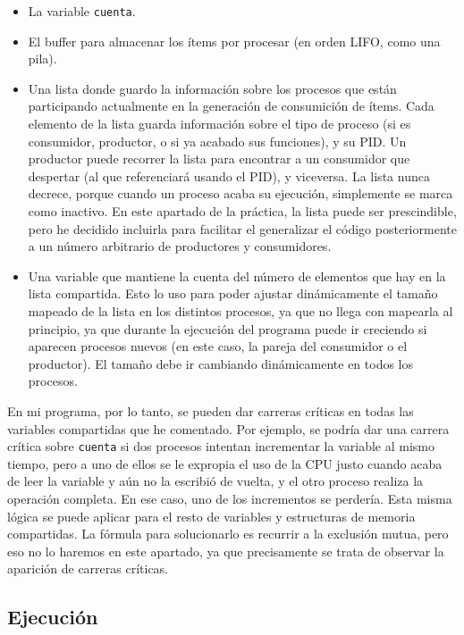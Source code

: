 \documentclass[a4paper]{article}
\begin{document}
\begin{itemize}
    \item La variable \texttt{cuenta}.
    \item El buffer para almacenar los ítems por procesar (en orden LIFO, como una pila).
    \item Una lista donde guardo la información sobre los procesos que están participando actualmente en la generación de consumición de ítems. Cada elemento de la lista guarda información sobre el tipo de proceso (si es consumidor, productor, o si ya acabado sus funciones), y su PID. Un productor puede recorrer la lista para encontrar a un consumidor que despertar (al que referenciará usando el PID), y viceversa. La lista nunca decrece, porque cuando un proceso acaba su ejecución, simplemente se marca como inactivo. En este apartado de la práctica, la lista puede ser prescindible, pero he decidido incluirla para facilitar el generalizar el código posteriormente a un número arbitrario de productores y consumidores.
    \item Una variable que mantiene la cuenta del número de elementos que hay en la lista compartida. Esto lo uso para poder ajustar dinámicamente el tamaño mapeado de la lista en los distintos procesos, ya que no llega con mapearla al principio, ya que durante la ejecución del programa puede ir creciendo si aparecen procesos nuevos (en este caso, la pareja del consumidor o el productor). El tamaño debe ir cambiando dinámicamente en todos los procesos.
\end{itemize}

En mi programa, por lo tanto, se pueden dar carreras críticas en todas las variables compartidas que he comentado. Por ejemplo, se podría dar una carrera crítica sobre \texttt{cuenta} si dos procesos intentan incrementar la variable al mismo tiempo, pero a uno de ellos se le expropia el uso de la CPU justo cuando acaba de leer la variable y aún no la escribió de vuelta, y el otro proceso realiza la operación completa. En ese caso, uno de los incrementos se perdería. Esta misma lógica se puede aplicar para el resto de variables y estructuras de memoria compartidas. La fórmula para solucionarlo es recurrir a la exclusión mutua, pero eso no lo haremos en este apartado, ya que precisamente se trata de observar la aparición de carreras críticas.

\subsection{Ejecución}
\end{document}
